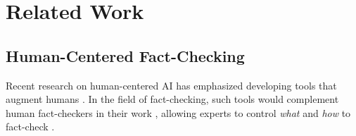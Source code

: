 \section{Related Work}
\subsection{Human-Centered Fact-Checking}
Recent research on human-centered AI has emphasized developing tools that augment humans \citep{akata2020research, nakov2021automated}. In the field of fact-checking, such tools would complement human fact-checkers in their work \citep{micallef2022true, graves2017anatomy}, allowing experts to control \emph{what} and \emph{how} to fact-check \citep{das2023state}.

